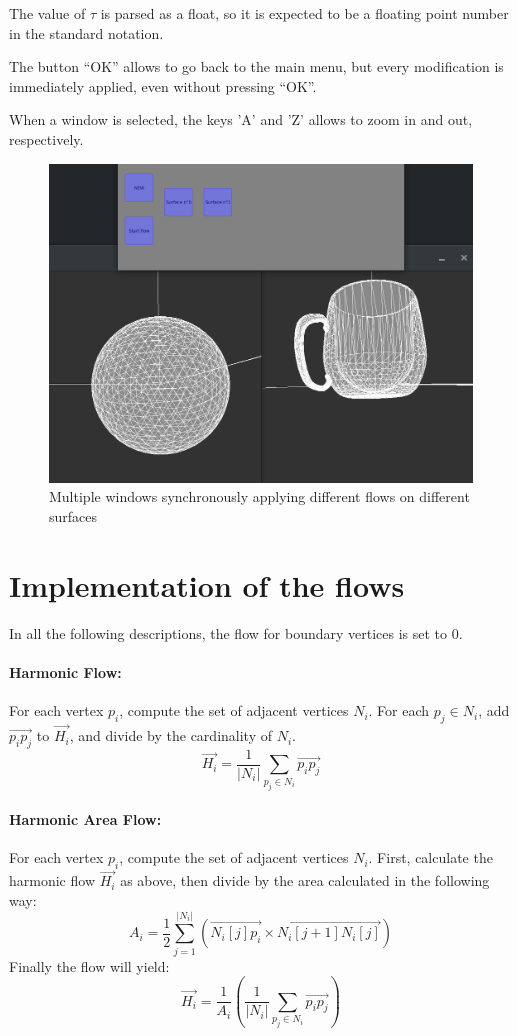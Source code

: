 \documentclass{article}
\begin{document}
The value of $\tau$ is parsed as a float, so it is expected to be a floating point
number in the standard notation.

The button ``OK'' allows to go back to the main menu, but every modification
is immediately applied, even without pressing ``OK''.

When a window is selected, the keys 'A' and 'Z' allows to zoom in and out, respectively.

\begin{figure}[h]
  \begin{center}
    \includegraphics[width=.5\textwidth]{img/mult.png}
    \caption{Multiple windows synchronously applying different flows on different surfaces}
    \label{fig:mult}
  \end{center}
\end{figure}

\section*{Implementation of the flows}

In all the following descriptions, the flow for boundary vertices is set to 0.

\paragraph*{Harmonic Flow:}
For each vertex $p_i$, compute the set of adjacent vertices $N_i$.
For each $p_j \in N_i$, add $\overrightarrow{p_i p_j}$ to $\overrightarrow{H_i}$, and divide by
the cardinality of $N_i$.
\begin{equation*}
  \overrightarrow{H_i}=\frac{1}{|N_i|} \sum_{p_j \in N_i} \overrightarrow{p_i p_j}
\end{equation*}

\paragraph*{Harmonic Area Flow:}
For each vertex $p_i$, compute the set of adjacent vertices $N_i$.
First, calculate the harmonic flow $\overrightarrow{H_i}$ as above, then divide by the area
calculated in the following way:
\begin{equation*}
  A_i = \frac{1}{2} \sum_{j = 1}^{|N_i|} (\overrightarrow{N_i[j] p_i} \times \overrightarrow{N_i[j+1] N_i[j]} )
\end{equation*}
Finally the flow will yield:
\begin{equation*}
  \overrightarrow{H_i}=\frac{1}{A_i} \left( \frac{1}{|N_i|} \sum_{p_j \in N_i} \overrightarrow{p_i p_j} \right)
\end{equation*}
\end{document}
